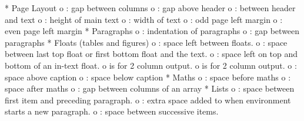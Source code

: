 

    * Page Layout
          o \columnsep: gap between columns
          o \topmargin: gap above header
          o \topskip: between header and text
          o \textheight: height of main text
          o \textwidth: width of text
          o \oddsidemargin: odd page left margin
          o \evensidemargin : even page left margin
    * Paragraphs
          o \parindent: indentation of paragraphs
          o \parskip: gap between paragraphs
    * Floats (tables and figures)
          o \floatsep: space left between floats.
          o \textfloatsep: space between last top float or first bottom float and the text.
          o \intextsep : space left on top and bottom of an in-text float.
          o \dbltextfloatsep is \textfloatsep for 2 column output.
          o \dblfloatsep is \floatsep for 2 column output.
          o \abovecaptionskip: space above caption
          o \belowcaptionskip: space below caption
    * Maths
          o \abovedisplayskip: space before maths
          o \belowdisplayskip: space after maths
          o \arraycolsep: gap between columns of an array
    * Lists
          o \topsep: space between first item and preceding paragraph.
          o \partopsep: extra space added to \topsep when environment starts a new paragraph.
          o \itemsep: space between successive items.

